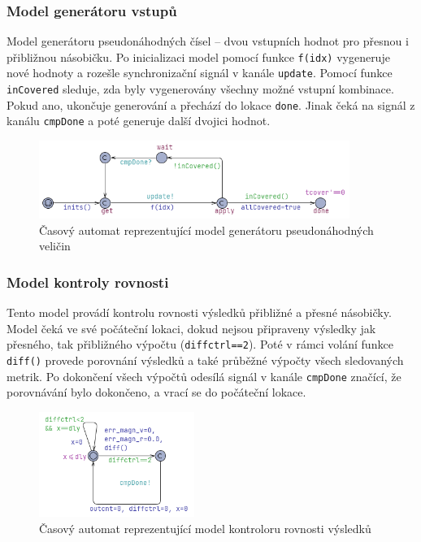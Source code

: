 \subsubsection{Model generátoru vstupů}
Model generátoru pseudonáhodných čísel -- dvou vstupních hodnot pro přesnou i přibližnou násobičku. Po inicializaci model pomocí funkce \texttt{f(idx)} vygeneruje nové hodnoty a rozešle synchronizační signál v kanále \texttt{update}. Pomocí funkce \texttt{inCovered} sleduje, zda byly vygenerovány všechny možné vstupní kombinace. Pokud ano, ukončuje generování a přechází do lokace \texttt{done}. Jinak čeká na signál z kanálu \texttt{cmpDone} a poté generuje další dvojici hodnot.

\begin{figure}[H]
    \centering
    \includegraphics[width=0.9\textwidth]{obrazky-figures/model_tmul2_tb_random.png}
    \caption{Časový automat reprezentující model generátoru pseudonáhodných veličin}
    \label{fig:model_tmul2_tb_random}
\end{figure}

\subsubsection{Model kontroly rovnosti}
Tento model provádí kontrolu rovnosti výsledků přibližné a přesné násobičky. Model čeká ve své počáteční lokaci, dokud nejsou připraveny výsledky jak přesného, tak přibližného výpočtu (\texttt{diffctrl==2}). Poté v rámci volání funkce \texttt{diff()} provede porovnání výsledků a také průběžné výpočty všech sledovaných metrik. Po dokončení všech výpočtů odesílá signál v kanále \texttt{cmpDone} značící, že porovnávání bylo dokončeno, a vrací se do počáteční lokace.

\begin{figure}[H]
    \centering
    \includegraphics[width=0.45\textwidth]{obrazky-figures/model_eval_diff.png}
    \caption{Časový automat reprezentující model kontroloru rovnosti výsledků}
    \label{fig:model_eval_diff}
\end{figure}

